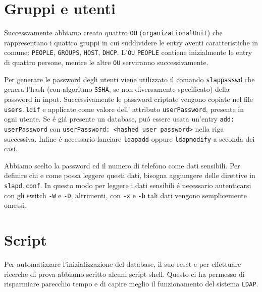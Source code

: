 \documentclass[11pt, a4paper, oneside]{article}
\begin{document}
		\section{Gruppi e utenti}
			\par
				Successvamente abbiamo creato quattro 
				\texttt{OU} (\texttt{organizationalUnit}) che 
				rappresentano i quattro gruppi in cui 
				suddividere le entry aventi caratteristiche in 
				comune:
				\texttt{PEOPLE}, \texttt{GROUPS}, 
				\texttt{HOST}, \texttt{DHCP}.
				L'\texttt{OU} \texttt{PEOPLE} contiene 
				inizialmente le entry di quattro persone, 
				mentre le altre \texttt{OU} serviranno 
				successivamente.
			\par
				Per generare le password degli utenti viene 
				utilizzato il comando \texttt{slappasswd} che 
				genera l'hash (con algoritmo \texttt{SSHA}, se 
				non diversamente specificato) della password in input.
				Successivamente le password criptate vengono 
				copiate nel file \texttt{users.ldif} 
				e applicate come valore dell' attributo 
				\texttt{userPassword}, presente in ogni utente. 
				Se \'e gi\'a presente un database, pu\'o 
				essere usata un'entry
				\texttt{add: userPassword} con 
				\texttt{userPassword: <hashed user password>} 
				nella riga successiva. Infine \'e necessario 
				lanciare \texttt{ldapadd} oppure 
				\texttt{ldapmodify} a seconda dei casi.
			\par
				Abbiamo scelto la password ed il numero di 
				telefono come dati sensibili. Per definire chi 
				e come possa leggere questi dati, bisogna 
				aggiungere delle direttive in 
				\texttt{slapd.conf}. In questo modo per leggere 
				i dati sensibili \'e necessario autenticarsi 
				con gli switch \texttt{-W} e \texttt{-D}, 
				altrimenti, con \texttt{-x} e \texttt{-b} tali 
				dati vengono semplicemente omessi.
		\section{Script}
			\par
				Per automatizzare l'inizializzazione del
				database, il suo reset e per effettuare
				ricerche di prova abbiamo scritto alcuni script 
				shell. Questo ci ha permesso di risparmiare 
				parecchio tempo e di capire meglio il 
				funzionamento del sistema \texttt{LDAP}.
\end{document}
